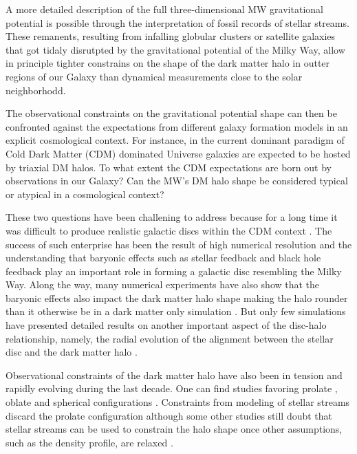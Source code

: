 \documentclass[usenatbib]{mnras}
\begin{document}
A more detailed description of the full three-dimensional MW
gravitational potential is possible through the interpretation of 
fossil records of stellar streams.
These remanents, resulting from infalling globular clusters or
satellite galaxies that got tidaly disrutpted by the gravitational
potential of the Milky Way, allow in principle tighter constrains 
on the shape of the dark matter halo in outter regions of our Galaxy
\citep{1998ApJ...495..297J,1999MNRAS.307..495H, 1999MNRAS.307..877T}
than dynamical measurements close to the solar neighborhodd.

The observational constraints on the gravitational potential shape can then
be confronted against the expectations from different galaxy formation
models in an explicit cosmological context.
For instance, in the current dominant paradigm of Cold Dark Matter
(CDM) dominated Universe galaxies are expected to be hosted by
triaxial DM halos. To what extent the CDM expectations are born out by
observations in our Galaxy? Can the MW's DM halo shape be considered
typical or atypical in a cosmological context?



These two questions have been challening to address because for a long
time it was difficult to produce realistic galactic discs within the
CDM context \citep{1997ApJ...478...13N}.
The success of such enterprise has been the result of high numerical
resolution and the understanding that baryonic effects such as stellar
feedback and black hole feedback play an important role in forming a
galactic disc resembling the Milky Way.
Along the way, many numerical experiments have also show that the baryonic
effects also impact the dark matter halo shape making the halo rounder
than it otherwise be in a dark matter only simulation
\citep{Dubinski94,Debattista08,Kazantzidis10,Abadi10,Bryan13,Chua19,Artale19}. 
But only few simulations have presented detailed results on another
important aspect of the disc-halo relationship, namely, the radial
evolution of the alignment between the stellar disc and the dark
matter halo \citep{Bailin05,Debattista13}.  

Observational constraints of the dark matter halo
have also been in tension and rapidly evolving during the last decade.  
One can find studies favoring prolate
\citep{Banerjee_and_Chanda_2011,Bowden_et_al._2016},  oblate
\citep{LM10,Deg_and_Widrow_2013,Vera-Ciro_and_Helmi_2013} and
spherical configurations \citep{Bovy16}.  
Constraints from modeling of stellar streams discard the prolate
configuration \citep{LM10,Pearson_et_al._2015,Bovy16} although some other studies
still doubt that stellar streams can be used to constrain the halo
shape once other assumptions, such as the density profile, are relaxed
\citep{Ibata_et_al._2013}. 
\end{document}
